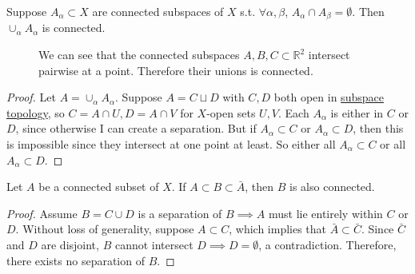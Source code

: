   \begin{theorem}
    \label{thm:conditions-for-union-of-connected-spaces-to-be}
    Suppose $A_\alpha \subset X$ are connected subspaces of $X$ s.t. $\forall \alpha, \beta$, $A_\alpha \cap A_\beta = \emptyset$. Then $\cup_\alpha A_\alpha$ is connected. 

    \begin{figure}[H]
      \centering 
      \caption{We can see that the connected subspaces $A, B, C \subset \mathbb{R}^2$ intersect pairwise at a point. Therefore their unions is connected. } 
    \end{figure}
  \end{theorem}
  \begin{proof}
    Let $A = \cup_\alpha A_\alpha$. Suppose $A = C \sqcup D$ with $C, D$ both open in \hyperref[def:subspace-topology]{subspace topology}, so $C = A \cap U, D = A \cap V$ for $X$-open sets $U, V$. Each $A_\alpha$ is either in $C$ or $D$, since otherwise I can create a separation. But if $A_\alpha \subset C$ or $A_\alpha \subset D$, then this is impossible since they intersect at one point at least. So either all $A_\alpha \subset C$ or all $A_\alpha \subset D$. 
  \end{proof} 

  \begin{theorem}
    \label{thm:connected-sets-plus-some-all-limit-points-are}
    Let $A$ be a connected subset of $X$. If $A \subset B \subset \bar{A}$, then $B$ is also connected. 
  \end{theorem}
  \begin{proof}
    Assume $B = C \cup D$ is a separation of $B \implies A$ must lie entirely within $C$ or $D$. Without loss of generality, suppose $A \subset C$, which implies that $\bar{A} \subset \bar{C}$. Since $\bar{C}$ and $D$ are disjoint, $B$ cannot intersect $D \implies D = \emptyset$, a contradiction. Therefore, there exists no separation of $B$. 
  \end{proof}

